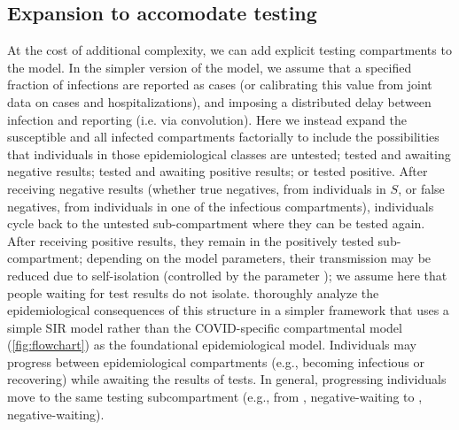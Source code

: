 \documentclass[12pt]{article}\usepackage[]{graphicx}\usepackage[]{color}
\begin{document}
\thickredline

\subsection*{Expansion to accomodate testing}

At the cost of additional complexity, we can add explicit testing compartments to the model.
In the simpler version of the model, we assume that a specified fraction of infections are reported as cases (or calibrating this value from joint data on cases and hospitalizations), and imposing a distributed delay between infection and reporting (i.e. via convolution).
Here we instead expand the susceptible and all infected compartments factorially to include the possibilities that individuals in those epidemiological classes are untested; tested and awaiting negative results; tested and awaiting positive results; or tested positive.
After receiving negative results (whether true negatives, from individuals in $S$, or false negatives, from individuals in one of the infectious compartments), individuals cycle back to the untested sub-compartment where they can be tested again. After receiving positive results, they remain in the positively tested sub-compartment; depending on the model parameters, their transmission may be reduced due to self-isolation (controlled by the parameter ); we assume here that people waiting for test results do not isolate.
\cite{Ghar+22} thoroughly analyze the epidemiological consequences of this structure in a simpler framework that uses a simple SIR model rather than the COVID-specific compartmental model (\cref{fig:flowchart}) as the foundational epidemiological model.
Individuals may progress between epidemiological compartments (e.g., becoming infectious or recovering) while awaiting the results of tests. In general, progressing individuals move to the same testing subcompartment (e.g., from , negative-waiting to , negative-waiting).
\end{document}
